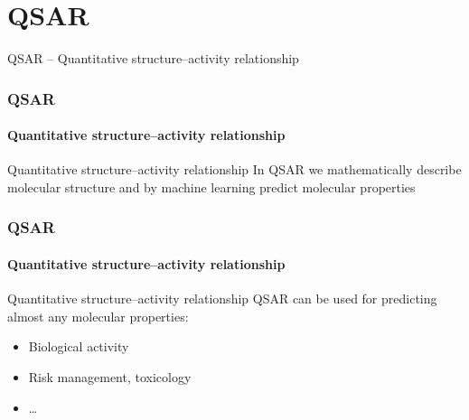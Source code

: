 \documentclass[aspectratio=169,dvipsnames]{beamer}
\begin{document}
\section{QSAR}
\begin{frame}[plain]
\hfill\LARGE QSAR -- Quantitative structure–activity relationship \hfill\normalsize
\end{frame}

    \begin{frame}
        \frametitle{QSAR}
        \framesubtitle{Quantitative structure–activity relationship}

        \begin{block}{Quantitative structure–activity relationship}
            In QSAR we mathematically describe molecular structure and by machine learning predict molecular properties
        \end{block}
    \end{frame}
    
    \begin{frame}
        \frametitle{QSAR}
        \framesubtitle{Quantitative structure–activity relationship}

        \begin{block}{Quantitative structure–activity relationship}
            QSAR can be used for predicting almost any molecular properties:
            \begin{itemize}
                \item Biological activity
                \item Risk management, toxicology
                \item \ldots
            \end{itemize}
        \end{block}

    \end{frame}
\end{document}
